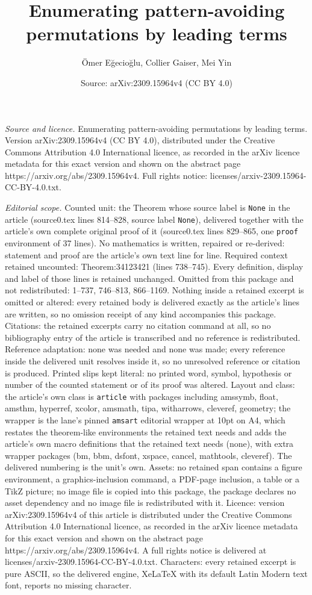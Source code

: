 \documentclass[10pt,a4paper]{amsart}
\title[Enumerating pattern-avoiding permutations by leading terms]{Enumerating pattern-avoiding permutations by leading terms}
\author{\"Omer E\u{g}ecio\u{g}lu, Collier Gaiser, Mei Yin}
\date{Source: arXiv:2309.15964v4 (CC BY 4.0)}
\begin{document}
\maketitle

\noindent\emph{Source and licence.} Enumerating pattern-avoiding permutations by leading terms. Version arXiv:2309.15964v4 (CC BY 4.0), distributed under the Creative Commons Attribution 4.0 International licence, as recorded in the arXiv licence metadata for this exact version and shown on the abstract page https://arxiv.org/abs/2309.15964v4. Full rights notice: licenses/arxiv-2309.15964-CC-BY-4.0.txt.\par\smallskip

\noindent\textit{Editorial scope.} Counted unit: the Theorem whose source label is \texttt{None} in the article (source0.tex lines 814--828, source label \texttt{None}), delivered together with the article's own complete original proof of it (source0.tex lines 829--865, one \texttt{proof} environment of 37 lines). No mathematics is written, repaired or re-derived: statement and proof are the article's own text line for line. Required context retained uncounted: Theorem:34123421 (lines 738--745). Every definition, display and label of those lines is retained unchanged. Omitted from this package and not redistributed: 1--737, 746--813, 866--1169. Nothing inside a retained excerpt is omitted or altered: every retained body is delivered exactly as the article's lines are written, so no omission receipt of any kind accompanies this package. Citations: the retained excerpts carry no citation command at all, so no bibliography entry of the article is transcribed and no reference is redistributed. Reference adaptation: none was needed and none was made; every reference inside the delivered unit resolves inside it, so no unresolved reference or citation is produced. Printed slips kept literal: no printed word, symbol, hypothesis or number of the counted statement or of its proof was altered. Layout and class: the article's own class is \texttt{article} with packages including amssymb, float, amsthm, hyperref, xcolor, amsmath, tipa, witharrows, cleveref, geometry; the wrapper is the lane's pinned \texttt{amsart} editorial wrapper at 10pt on A4, which restates the theorem-like environments the retained text needs and adds the article's own macro definitions that the retained text needs (none), with extra wrapper packages (bm, bbm, dsfont, xspace, cancel, mathtools, cleveref). The delivered numbering is the unit's own. Assets: no retained span contains a figure environment, a graphics-inclusion command, a PDF-page inclusion, a table or a TikZ picture; no image file is copied into this package, the package declares no asset dependency and no image file is redistributed with it. Licence: version arXiv:2309.15964v4 of this article is distributed under the Creative Commons Attribution 4.0 International licence, as recorded in the arXiv licence metadata for this exact version and shown on the abstract page https://arxiv.org/abs/2309.15964v4. A full rights notice is delivered at licenses/arxiv-2309.15964-CC-BY-4.0.txt. Characters: every retained excerpt is pure ASCII, so the delivered engine, XeLaTeX with its default Latin Modern text font, reports no missing character.
\end{document}
